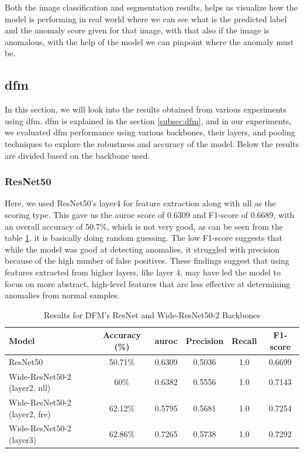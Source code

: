Both the image classification and segmentation results, helps us visualize how the model is performing in real world where we can see what is the predicted label and the anomaly score given for that image, with that also if the image is anomalous, with the help of the model we can pinpoint where the anomaly must be.

\subsection*{\gls{dfm}}

In this section, we will look into the results obtained from various experiments using \gls{dfm}. \gls{dfm} is explained in the section \ref{subsec:dfm}, and in our experiments, we evaluated \gls{dfm} performance using various backbones, their layers, and pooling techniques to explore the robustness and accuracy of the model. Below the results are divided based on the backbone used. 

\subsubsection*{ResNet50}

Here, we used ResNet50's layer4 for feature extraction along with \gls{nll} as the scoring type. This gave us the \gls{auroc} score of 0.6309 and F1-score of 0.6689, with an overall accuracy of 50.7\%, which is not very good, as can be seen from the table \ref{tab:dfm resnet results}, it is basically doing random guessing. The low F1-score suggests that while the model was good at detecting anomalies, it struggled with precision because of the high number of false positives. These findings suggest that using features extracted from higher layers, like layer 4, may have led the model to focus on more abstract, high-level features that are less effective at determining anomalies from normal samples.

\begin{table}[ht!]
    \centering
    \begin{tabular}{|l|c|c|c|c|c|}
        \hline
        \textbf{Model} & \textbf{Accuracy (\%)} & \textbf{\gls{auroc}} &\textbf{Precision} & \textbf{Recall} & \textbf{F1-score} \\ \hline
        ResNet50 & 50.71\% & 0.6309 & 0.5036 & 1.0 & 0.6699 \\ \hline
        Wide-ResNet50-2 (layer2, nll) & 60\% & 0.6382 & 0.5556 & 1.0 & 0.7143 \\ \hline
        Wide-ResNet50-2 (layer2, fre) & 62.12\% & 0.5795 & 0.5681 & 1.0 & 0.7254 \\ \hline
        Wide-ResNet50-2 (layer3) & 62.86\% & 0.7265 & 0.5738 & 1.0 & 0.7292 \\ \hline
    \end{tabular}
    \caption{Results for DFM's ResNet and Wide-ResNet50-2 Backbones}
    \label{tab:dfm resnet results}
\end{table}


